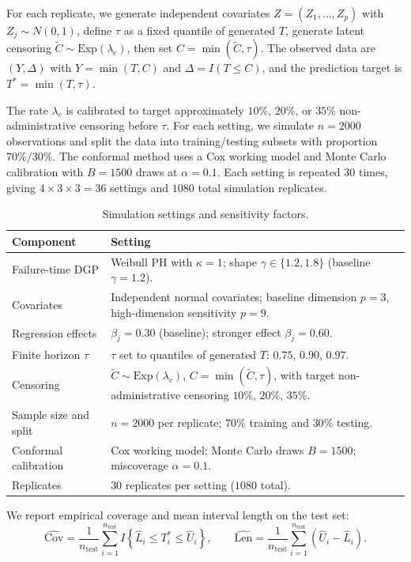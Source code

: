 \documentclass[11pt]{article}
\begin{document}
For each replicate, we generate independent covariates $Z=(Z_1,\dots,Z_p)$ with
$Z_j\sim N(0,1)$, define $\tau$ as a fixed quantile of generated $T$, generate latent
censoring $\widetilde C\sim\mathrm{Exp}(\lambda_c)$, then set $C=\min(\widetilde C,\tau)$.
The observed data are $(Y,\Delta)$ with $Y=\min(T,C)$ and $\Delta=I(T\le C)$, and the
prediction target is $T^*=\min(T,\tau)$.

The rate $\lambda_c$ is calibrated to target approximately $10\%$, $20\%$, or $35\%$
non-administrative censoring before $\tau$. For each setting, we simulate $n=2000$
observations and split the data into training/testing subsets with proportion $70\%/30\%$.
The conformal method uses a Cox working model and Monte Carlo calibration with
$B=1500$ draws at $\alpha=0.1$. Each setting is repeated $30$ times, giving
$4\times 3\times 3=36$ settings and $1080$ total simulation replicates.

\begin{table}[htbp]
\centering
\caption{Simulation settings and sensitivity factors.}
\label{tab:sim_settings}
\begin{tabular}{@{}p{}p{}@{}}
\toprule
Component & Setting \\
\midrule
Failure-time DGP & Weibull PH with $\kappa=1$; shape $\gamma\in\{1.2,1.8\}$ (baseline $\gamma=1.2$). \\
Covariates & Independent normal covariates; baseline dimension $p=3$, high-dimension sensitivity $p=9$. \\
Regression effects & $\beta_j=0.30$ (baseline); stronger effect $\beta_j=0.60$. \\
Finite horizon $\tau$ & $\tau$ set to quantiles of generated $T$: $0.75$, $0.90$, $0.97$. \\
Censoring & $\widetilde C\sim\mathrm{Exp}(\lambda_c)$, $C=\min(\widetilde C,\tau)$, with target non-administrative censoring $10\%$, $20\%$, $35\%$. \\
Sample size and split & $n=2000$ per replicate; $70\%$ training and $30\%$ testing. \\
Conformal calibration & Cox working model; Monte Carlo draws $B=1500$; miscoverage $\alpha=0.1$. \\
Replicates & $30$ replicates per setting ($1080$ total). \\
\bottomrule
\end{tabular}
\end{table}

We report empirical coverage and mean interval length on the test set:
\[
\widehat{\mathrm{Cov}}=\frac{1}{n_{\text{test}}}\sum_{i=1}^{n_{\text{test}}}
I\!\left\{\widehat L_i\le T_i^*\le \widehat U_i\right\},\qquad
\widehat{\mathrm{Len}}=\frac{1}{n_{\text{test}}}\sum_{i=1}^{n_{\text{test}}}
(\widehat U_i-\widehat L_i).
\]
\end{document}
